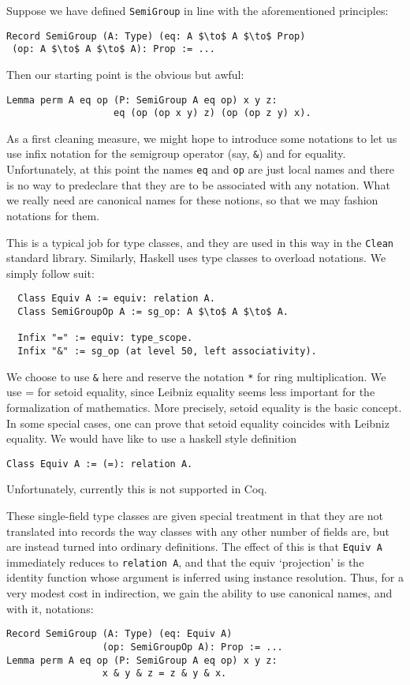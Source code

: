 \documentclass[a4paper,10pt,runningheads]{llncs}
\begin{document}
Suppose we have defined \lstinline|SemiGroup| in line with the aforementioned principles:
\begin{lstlisting}
Record SemiGroup (A: Type) (eq: A $\to$ A $\to$ Prop)
 (op: A $\to$ A $\to$ A): Prop := ...
\end{lstlisting}

Then our starting point is the obvious but awful:
\begin{lstlisting}
Lemma perm A eq op (P: SemiGroup A eq op) x y z:
                   eq (op (op x y) z) (op (op z y) x).
\end{lstlisting}

As a first cleaning measure, we might hope to introduce some notations to let us use infix notation
for the semigroup operator (say, \lstinline|&|) and for equality. Unfortunately, at this point the names \lstinline|eq| and \lstinline|op| are just local names and there is no way to predeclare that they are to be associated with any notation. What we really need are canonical names for these notions, so that we may fashion notations for them.

This is a typical job for type classes, and they are used in this way in the \lstinline|Clean| standard
library. Similarly, Haskell uses type classes to overload notations.
We simply follow suit:
\begin{lstlisting}
  Class Equiv A := equiv: relation A.
  Class SemiGroupOp A := sg_op: A $\to$ A $\to$ A.

  Infix "=" := equiv: type_scope.
  Infix "&" := sg_op (at level 50, left associativity).
\end{lstlisting}

We choose to use \lstinline|&| here and reserve the notation \lstinline|*| for ring multiplication. We use = for setoid equality, since Leibniz equality seems less important for the formalization of
mathematics. More precisely, setoid equality is the basic concept. In some special cases, one can prove
that setoid equality coincides with Leibniz equality.
We would have like to use a haskell style definition
\begin{lstlisting}
Class Equiv A := (=): relation A.
\end{lstlisting}
Unfortunately, currently this is not supported in Coq.

These single-field type classes are given special treatment in that they are not translated into
records the way classes with any other number of fields are, but are instead turned into ordinary
definitions. The effect of this is that \lstinline|Equiv A| immediately reduces to \lstinline|relation A|, and that the equiv `projection' is the identity function whose argument is inferred using instance resolution. Thus, for a very modest cost in indirection, we gain the ability to use canonical names, and with it, notations:
\begin{lstlisting}
Record SemiGroup (A: Type) (eq: Equiv A)
                 (op: SemiGroupOp A): Prop := ...
Lemma perm A eq op (P: SemiGroup A eq op) x y z:
                 x & y & z = z & y & x.
\end{lstlisting}
\end{document}
